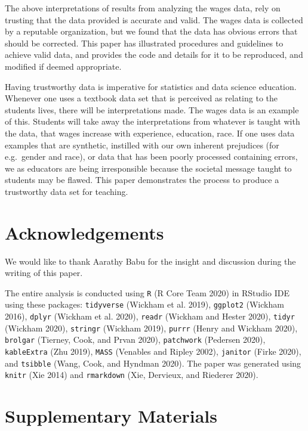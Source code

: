 \documentclass{article}
\begin{document}
The above interpretations of results from analyzing the wages data, rely on trusting that the data provided is accurate and valid. The wages data is collected by a reputable organization, but we found that the data has obvious errors that should be corrected. This paper has illustrated procedures and guidelines to achieve valid data, and provides the code and details for it to be reproduced, and modified if deemed appropriate.

Having trustworthy data is imperative for statistics and data science education. Whenever one uses a textbook data set that is perceived as relating to the students lives, there will be interpretations made. The wages data is an example of this. Students will take away the interpretations from whatever is taught with the data, that wages increase with experience, education, race. If one uses data examples that are synthetic, instilled with our own inherent prejudices (for e.g.~gender and race), or data that has been poorly processed containing errors, we as educators are being irresponsible because the societal message taught to students may be flawed. This paper demonstrates the process to produce a trustworthy data set for teaching.

\hypertarget{acknowledgements}{%
\section{Acknowledgements}\label{acknowledgements}}

We would like to thank Aarathy Babu for the insight and discussion during the writing of this paper.

The entire analysis is conducted using \texttt{R} (R Core Team 2020) in RStudio IDE using these packages: \texttt{tidyverse} (Wickham et al. 2019), \texttt{ggplot2} (Wickham 2016), \texttt{dplyr} (Wickham et al. 2020), \texttt{readr} (Wickham and Hester 2020), \texttt{tidyr} (Wickham 2020), \texttt{stringr} (Wickham 2019), \texttt{purrr} (Henry and Wickham 2020), \texttt{brolgar} (Tierney, Cook, and Prvan 2020), \texttt{patchwork} (Pedersen 2020), \texttt{kableExtra} (Zhu 2019), \texttt{MASS} (Venables and Ripley 2002), \texttt{janitor} (Firke 2020), and \texttt{tsibble} (Wang, Cook, and Hyndman 2020). The paper was generated using \texttt{knitr} (Xie 2014) and \texttt{rmarkdown} (Xie, Dervieux, and Riederer 2020).

\hypertarget{supplementary-materials}{%
\section{Supplementary Materials}\label{supplementary-materials}}
\end{document}
